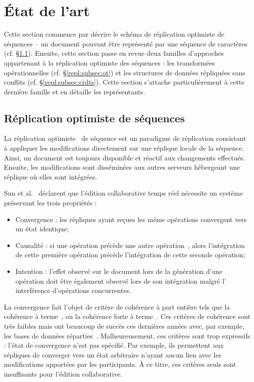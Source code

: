 

\section{État de l'art}
\label{repl:sec:stateoftheart}

Cette section commence par décrire le schéma de réplication optimiste de
séquences -- un document pouvant être représenté par une séquence de caractères
(cf. §\ref{repl:subsec:optimistic}).  Ensuite, cette section passe en revue deux
familles d'approches appartenant à la réplication optimiste des séquences : les
transformées opérationnelles (cf. §\ref{repl:subsec:ot}) et les structures de
données répliquées sans conflits (cf. §\ref{repl:subsec:crdts}). Cette section
s'attache particulièrement à cette dernière famille et en détaille les
représentants.

\subsection{Réplication optimiste de séquences}
\label{repl:subsec:optimistic}

La réplication optimiste~\cite{demers1987epidemic, johnson1975maintenance,
  ladin1992providing, saito2005optimistic} de séquence est un paradigme de
réplication consistant à appliquer les modifications directement sur une
réplique locale de la séquence.  Ainsi, un document est toujours disponible et
réactif aux changements effectués. Ensuite, les modifications sont disséminées
aux autres serveurs hébergeant une réplique où elles sont intégrées. 

Sun et al.~\cite{sun1998achieving} déclarent que l'édition collaborative temps
réel nécessite un système préservant les trois propriétés :
\begin{itemize}
\item Convergence : les répliques ayant reçues les même opérations convergent
  vers un état identique;
\item Causalité : si une opération précède une autre
  opération~\cite{lamport1978time}, alors l'intégration de cette première
  opération précède l'intégration de cette seconde opération;
\item Intention : l'effet observé sur le document lors de la génération d'une
  opération doit être également observé lors de son intégration malgré l'
  interférence d'opérations concurrentes.
\end{itemize}

\noindent La convergence fait l'objet de critère de cohérence à part entière
tels que la cohérence à terme~\cite{bailis2013eventual}, ou la cohérence forte à
terme~\cite{shapiro2011conflict}. Ces critères de cohérence sont très faibles
mais ont beaucoup de succès ces dernières années avec, par exemple, les bases de
données réparties~\cite{dynamo, riak, cassandra, mongodb}. Malheureusement, ces
critères sont trop expressifs : l'état de convergence n'est pas spécifié. Par
exemple, ils permettent aux répliques de converger vers un état arbitraire
n'ayant aucun lien avec les modifications apportées par les participants. À ce
titre, ces critères seuls sont insuffisants pour l'édition collaborative.

